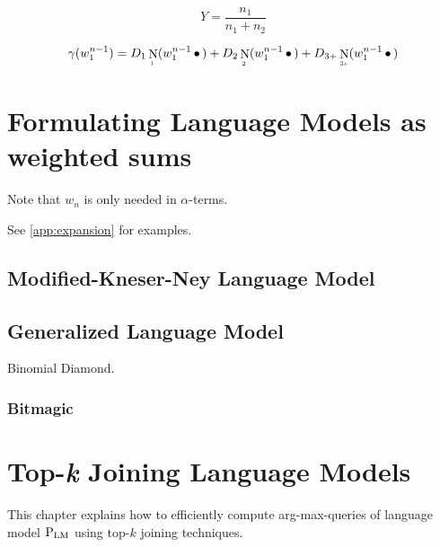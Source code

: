 \documentclass[11pt,a4paper]{report}
\newcommand*{\Scale}[2][4]{\scalebox{#1}{$#2$}}%
\DeclareMathOperator{\ContCount}{N}
\newcommand{\ContCountI}   {\ContCount_{\Scale[0.5]{1 }}}
\newcommand{\ContCountII}  {\ContCount_{\Scale[0.5]{2 }}}
\newcommand{\ContCountIIIp}{\ContCount_{\Scale[0.5]{3+}}}
\newcommand{\WSkp}{\ensuremath{\,\bullet\,}}
\begin{document}
\begin{equation}
  Y = \frac{n_1}{n_1 + n_2}
\end{equation}

\begin{equation}
  \gamma(w_1^{n-1}) =   D_1    \ContCountI    (w_1^{n-1} \WSkp)
                      + D_2    \ContCountII   (w_1^{n-1} \WSkp)
                      + D_{3+} \ContCountIIIp (w_1^{n-1} \WSkp)
\end{equation}

\chapter{Formulating Language Models as weighted sums}
\label{ch:lm-score-func}

Note that $w_n$ is only needed in $\alpha$-terms.

See \cref{app:expansion} for examples.

\section{Modified-Kneser-Ney Language Model}

\section{Generalized Language Model}

Binomial Diamond.

\subsection{Bitmagic}

\chapter{Top-\emph{k} Joining Language Models}
\label{ch:top-k-joining}


This chapter explains how to efficiently compute arg-max-queries of language
model $\Prob[\text{LM}]$ using top-$k$ joining techniques.
\end{document}
